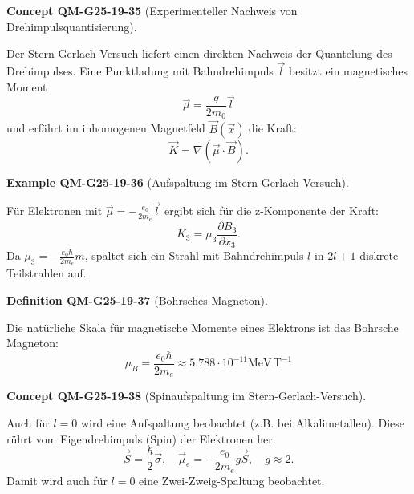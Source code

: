 \documentclass[10pt, letterpaper]{article}
\newcommand{\CustomHeading}[3]{%
  \par\medskip\noindent%
  \textbf{#1 #2} \textnormal{(#3)}.\enskip%
}
\newenvironment{DEF}[2]{\CustomHeading{Definition}{#1}{#2}}{}
\newenvironment{EXA}[2]{\CustomHeading{Example}{#1}{#2}}{}
\newenvironment{CONC}[2]{\CustomHeading{Concept}{#1}{#2}}{}
\begin{document}
\begin{CONC}{QM-G25-19-35}{Experimenteller Nachweis von Drehimpulsquantisierung}
Der Stern-Gerlach-Versuch liefert einen direkten Nachweis der Quantelung des Drehimpulses. Eine Punktladung mit Bahndrehimpuls \(\vec{l}\) besitzt ein magnetisches Moment
$$
\vec{\mu} = \frac{q}{2m_0} \vec{l}
$$
und erfährt im inhomogenen Magnetfeld \(\vec{B}(\vec{x})\) die Kraft:
$$
\vec{K} = \nabla (\vec{\mu} \cdot \vec{B}).
$$
\end{CONC}

\begin{EXA}{QM-G25-19-36}{Aufspaltung im Stern-Gerlach-Versuch}
Für Elektronen mit \(\vec{\mu} = -\frac{e_0}{2m_e} \vec{l}\) ergibt sich für die z-Komponente der Kraft:
$$
K_3 = \mu_3 \frac{\partial B_3}{\partial x_3}.
$$
Da \(\mu_3 = -\frac{e_0 \hbar}{2m_e} m\), spaltet sich ein Strahl mit Bahndrehimpuls \(l\) in \(2l + 1\) diskrete Teilstrahlen auf.
\end{EXA}

\begin{DEF}{QM-G25-19-37}{Bohrsches Magneton}
Die natürliche Skala für magnetische Momente eines Elektrons ist das Bohrsche Magneton:
$$
\mu_B = \frac{e_0 \hbar}{2m_e} \approx 5.788 \cdot 10^{-11} \mathrm{MeV\, T^{-1}}
$$
\end{DEF}

\begin{CONC}{QM-G25-19-38}{Spinaufspaltung im Stern-Gerlach-Versuch}
Auch für \(l = 0\) wird eine Aufspaltung beobachtet (z.B. bei Alkalimetallen). Diese rührt vom Eigendrehimpuls (Spin) der Elektronen her:
$$
\vec{S} = \frac{\hbar}{2} \vec{\sigma}, \quad \vec{\mu}_e = -\frac{e_0}{2m_e} g \vec{S}, \quad g \approx 2.
$$
Damit wird auch für \(l = 0\) eine Zwei-Zweig-Spaltung beobachtet.
\end{CONC}
\end{document}
